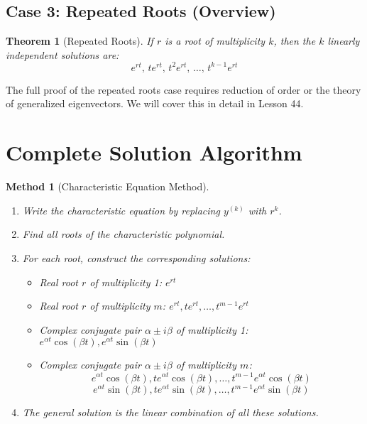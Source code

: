 \documentclass[12pt]{article}
\newtheorem{theorem}{Theorem}
\newtheorem{method}{Method}
\begin{document}
\subsection{Case 3: Repeated Roots (Overview)}

\begin{theorem}[Repeated Roots]
If $r$ is a root of multiplicity $k$, then the $k$ linearly independent solutions are:
$$e^{rt}, \, te^{rt}, \, t^2e^{rt}, \, \ldots, \, t^{k-1}e^{rt}$$
\end{theorem}

\begin{warning}
The full proof of the repeated roots case requires reduction of order or the theory of generalized eigenvectors. We will cover this in detail in Lesson 44.
\end{warning}

\section{Complete Solution Algorithm}

\begin{method}[Characteristic Equation Method]
\begin{enumerate}
    \item Write the characteristic equation by replacing $y^{(k)}$ with $r^k$.
    \item Find all roots of the characteristic polynomial.
    \item For each root, construct the corresponding solutions:
    \begin{itemize}
        \item Real root $r$ of multiplicity 1: $e^{rt}$
        \item Real root $r$ of multiplicity $m$: $e^{rt}, te^{rt}, \ldots, t^{m-1}e^{rt}$
        \item Complex conjugate pair $\alpha \pm i\beta$ of multiplicity 1: $e^{\alpha t}\cos(\beta t), e^{\alpha t}\sin(\beta t)$
        \item Complex conjugate pair $\alpha \pm i\beta$ of multiplicity $m$:
        $$e^{\alpha t}\cos(\beta t), te^{\alpha t}\cos(\beta t), \ldots, t^{m-1}e^{\alpha t}\cos(\beta t)$$
        $$e^{\alpha t}\sin(\beta t), te^{\alpha t}\sin(\beta t), \ldots, t^{m-1}e^{\alpha t}\sin(\beta t)$$
    \end{itemize}
    \item The general solution is the linear combination of all these solutions.
\end{enumerate}
\end{method}
\end{document}
